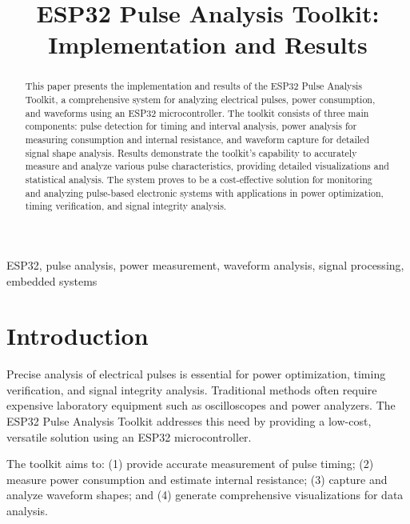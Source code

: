 \documentclass[conference]{IEEEtran}
\begin{document}
\title{ESP32 Pulse Analysis Toolkit:\\Implementation and Results}

\author{
}

\maketitle

\begin{abstract}
This paper presents the implementation and results of the ESP32 Pulse Analysis Toolkit, a comprehensive system for analyzing electrical pulses, power consumption, and waveforms using an ESP32 microcontroller. The toolkit consists of three main components: pulse detection for timing and interval analysis, power analysis for measuring consumption and internal resistance, and waveform capture for detailed signal shape analysis. Results demonstrate the toolkit's capability to accurately measure and analyze various pulse characteristics, providing detailed visualizations and statistical analysis. The system proves to be a cost-effective solution for monitoring and analyzing pulse-based electronic systems with applications in power optimization, timing verification, and signal integrity analysis.
\end{abstract}

\begin{IEEEkeywords}
ESP32, pulse analysis, power measurement, waveform analysis, signal processing, embedded systems
\end{IEEEkeywords}

\section{Introduction}
Precise analysis of electrical pulses is essential for power optimization, timing verification, and signal integrity analysis. Traditional methods often require expensive laboratory equipment such as oscilloscopes and power analyzers. The ESP32 Pulse Analysis Toolkit addresses this need by providing a low-cost, versatile solution using an ESP32 microcontroller.

The toolkit aims to: (1) provide accurate measurement of pulse timing; (2) measure power consumption and estimate internal resistance; (3) capture and analyze waveform shapes; and (4) generate comprehensive visualizations for data analysis.
\end{document}

